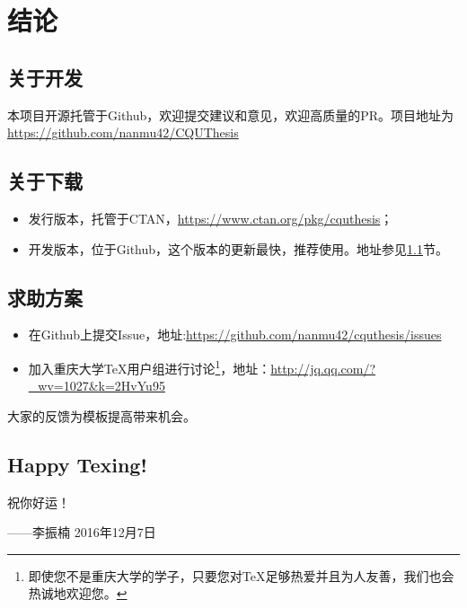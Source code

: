 \chapter{结论}
\section{关于开发}\label{sec:dev}
本项目开源托管于Github，欢迎提交建议和意见，欢迎高质量的PR。项目地址为\url{https://github.com/nanmu42/CQUThesis}
\section{关于下载}
\begin{itemize}
	\item 发行版本，托管于CTAN，\url{https://www.ctan.org/pkg/cquthesis}；
	\item 开发版本，位于Github，这个版本的更新最快，推荐使用。地址参见\ref{sec:dev}节。
\end{itemize}
\section{求助方案}
\begin{itemize}
	\item 在Github上提交Issue，地址:\url{https://github.com/nanmu42/cquthesis/issues}
	\item 加入重庆大学\TeX 用户组进行讨论\footnote{即使您不是重庆大学的学子，只要您对\TeX 足够热爱并且为人友善，我们也会热诚地欢迎您。}，地址：\url{http://jq.qq.com/?_wv=1027&k=2HvYu95}
\end{itemize}
 
大家的反馈为模板提高带来机会。
\section{Happy Texing!}
祝你好运！

\bigskip
\hfill ——李振楠 2016年12月7日